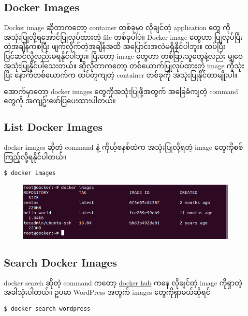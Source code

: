 \subsection{Docker Images}\label{docker-images-1}

Docker image ဆိုတာကတော့ container တစ်ခုမှာ လိုချင်တဲ့ application တွေ
ကိုအသုံးပြုလို့ရအောင်ပြုလုပ်ထားတဲ့ file တစ်ခုပါပဲ။ Docker image တွေဟာ
ပြုလုပ်ပြီးတဲ့အချိန်ကစပြီး ဖျက်လိုက်တဲ့အချိန်အထိ
အပြောင်းအလဲမရှိနိုင်ပါဘူး။ ထပ်ပြီးပြင်ဆင်လို့လည်းမရနိုင်ပါဘူး။ ပြီးတော့
image တွေဟာ တစ်ခြားသူတွေနဲ့လည်း မျှဝေအသုံးပြုနိုင်ပါသေးတယ်။
ဆိုလိုတာကတော့ တစ်ယောက်ပြုလုပ်ထားတဲ့ image ကိုသုံးပြီး နောက်တစ်ယောက်က
ထပ်တူကျတဲ့ container တစ်ခုကို အသုံးပြုနိုင်တာမျိုးပါ။

အောက်မှာတော့ docker images တွေကိုအသုံးပြုဖို့အတွက် အခြေခံကျတဲ့ command
တွေကို အကျဥ်းဖော်ပြပေးထားပါတယ်။

\subsection{List Docker Images}\label{list-docker-images}

docker images ဆိုတဲ့ command နဲ့ ကိုယ့်စနစ်ထဲက အသုံးပြုလို့ရတဲ့ image
တွေကိုစစ်ကြည့်လို့ရနိုင်ပါတယ်။

\begin{verbatim}
$ docker images
\end{verbatim}

\begin{figure}[htbp]
\centering
\includegraphics{.gitbook/assets/1_ls.png}
\end{figure}

\subsection{Search Docker Images}\label{search-docker-images}

docker search ဆိုတဲ့ command ကတော့ \href{https://hub.docker.com/}{docker
hub} ကနေ လိုချင်တဲ့ image ကိုရှာတဲ့အခါသုံးပါတယ်။ ဥပမာ WordPress အတွက်
images တွေကိုရှာမယ်ဆိုရင် -

\begin{verbatim}
$ docker search wordpress
\end{verbatim}

